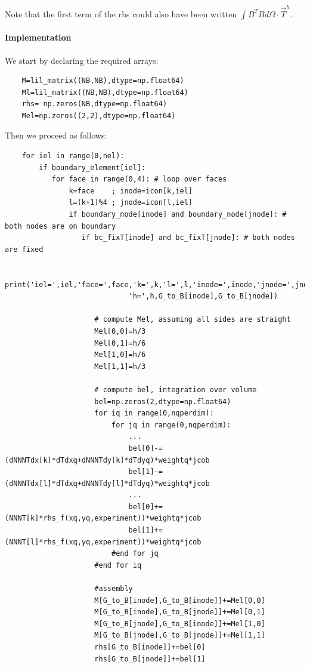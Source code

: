 Note that the first term of the rhs could also have been written $\int B^T B d\Omega \cdot \vec{T}^h$.




\paragraph{Implementation} We start by declaring the required arrays:
\begin{lstlisting}
    M=lil_matrix((NB,NB),dtype=np.float64)
    Ml=lil_matrix((NB,NB),dtype=np.float64)
    rhs= np.zeros(NB,dtype=np.float64)   
    Mel=np.zeros((2,2),dtype=np.float64) 
\end{lstlisting}

Then we proceed as follows:

\begin{lstlisting}
    for iel in range(0,nel):
        if boundary_element[iel]:
           for face in range(0,4): # loop over faces
               k=face    ; inode=icon[k,iel]
               l=(k+1)%4 ; jnode=icon[l,iel]
               if boundary_node[inode] and boundary_node[jnode]: # both nodes are on boundary
                  if bc_fixT[inode] and bc_fixT[jnode]: # both nodes are fixed

                     print('iel=',iel,'face=',face,'k=',k,'l=',l,'inode=',inode,'jnode=',jnode,
                             'h=',h,G_to_B[inode],G_to_B[jnode])

                     # compute Mel, assuming all sides are straight
                     Mel[0,0]=h/3  
                     Mel[0,1]=h/6  
                     Mel[1,0]=h/6  
                     Mel[1,1]=h/3  

                     # compute bel, integration over volume
                     bel=np.zeros(2,dtype=np.float64) 
                     for iq in range(0,nqperdim):
                         for jq in range(0,nqperdim):
                             ...
                             bel[0]-=(dNNNTdx[k]*dTdxq+dNNNTdy[k]*dTdyq)*weightq*jcob
                             bel[1]-=(dNNNTdx[l]*dTdxq+dNNNTdy[l]*dTdyq)*weightq*jcob
                             ...
                             bel[0]+=(NNNT[k]*rhs_f(xq,yq,experiment))*weightq*jcob
                             bel[1]+=(NNNT[l]*rhs_f(xq,yq,experiment))*weightq*jcob
                         #end for jq
                     #end for iq

                     #assembly                                          
                     M[G_to_B[inode],G_to_B[inode]]+=Mel[0,0]
                     M[G_to_B[inode],G_to_B[jnode]]+=Mel[0,1]
                     M[G_to_B[jnode],G_to_B[inode]]+=Mel[1,0]
                     M[G_to_B[jnode],G_to_B[jnode]]+=Mel[1,1]
                     rhs[G_to_B[inode]]+=bel[0]
                     rhs[G_to_B[jnode]]+=bel[1]

\end{lstlisting}


